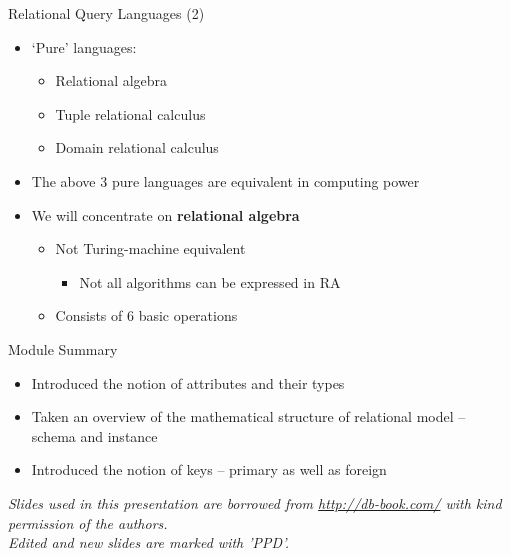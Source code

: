 \documentclass[aspectratio=169, xcolor=dvipsnames]{beamer}
\begin{document}
\begin{frame}{Relational Query Languages (2)}
    \begin{itemize}
        \item `Pure' languages:
        \begin{itemize}
            \item Relational algebra
            \item Tuple relational calculus
            \item Domain relational calculus
        \end{itemize}
        \item The above 3 pure languages are equivalent in computing power
        \item We will concentrate on \textbf{relational algebra}
        \begin{itemize}
            \item Not Turing-machine equivalent
            \begin{itemize}
                \item[$\triangleright$] Not all algorithms can be expressed in RA
            \end{itemize}
            \item Consists of 6 basic operations
        \end{itemize}
    \end{itemize}
\end{frame}

\begin{frame}{Module Summary}
    \begin{itemize}
        \item Introduced the notion of attributes and their types
        \item Taken an overview of the mathematical structure of relational model -- schema and instance
        \item Introduced the notion of keys -- primary as well as foreign
    \end{itemize}
    \vspace{2em}
    \begin{center}
    \small \textit{Slides used in this presentation are borrowed from \url{http://db-book.com/} with kind permission of the authors.} \\
    \small \textit{Edited and new slides are marked with 'PPD'.}
    \end{center}
\end{frame}
\end{document}
